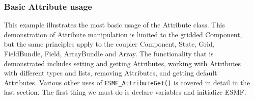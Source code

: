  
\setlength{\oldparskip}{\parskip}
\setlength{\parskip}{1.5ex}
\setlength{\oldparindent}{\parindent}
\setlength{\parindent}{0pt}
\setlength{\oldbaselineskip}{\baselineskip}
\setlength{\baselineskip}{11pt}
 
\def\bv{\begin{verbatim}}
\def\ev{\end{verbatim}}
\def\be{\begin{equation}}
\def\ee{\end{equation}}
\def\bea{\begin{eqnarray}}
\def\eea{\end{eqnarray}}
\def\bi{\begin{itemize}}
\def\ei{\end{itemize}}
\def\bn{\begin{enumerate}}
\def\en{\end{enumerate}}
\def\bd{\begin{description}}
\def\ed{\end{description}}
\def\({\left (}
\def\){\right )}
\def\[{\left [}
\def\]{\right ]}
\def\<{\left  \langle}
\def\>{\right \rangle}
\def\cI{{\cal I}}
\def\diag{\mathop{\rm diag}}
\def\tr{\mathop{\rm tr}}


 

   \subsubsection{Basic Attribute usage} \label{ex:AttributeEx}
  
   This example illustrates the most basic usage of the Attribute class.  
   This demonstration of Attribute manipulation is limited to the gridded 
   Component, but the same principles apply to the coupler Component, State, 
   Grid, FieldBundle, Field, ArrayBundle and Array.  The
   functionality that is demonstrated includes setting and getting Attributes, 
   working with Attributes with different types and lists, removing Attributes,
   and getting default Attributes.  Various other uses of 
   {\tt ESMF\_AttributeGet()} is covered in detail in the last section.  The
   first thing we must do is declare variables and initialize ESMF. 

